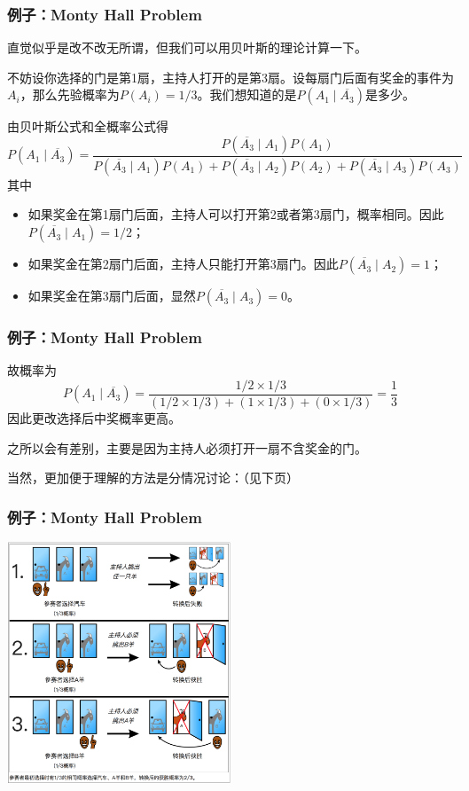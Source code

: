 \documentclass[9pt,dvipsnames]{beamer}
\begin{document}
\begin{frame}
	\frametitle{例子：Monty Hall Problem}
	直觉似乎是改不改无所谓，但我们可以用贝叶斯的理论计算一下。

	不妨设你选择的门是第1扇，主持人打开的是第3扇。设每扇门后面有奖金的事件为$A_i$，那么先验概率为$P(A_i)=1/3$。我们想知道的是$P(A_1\mid \overline{A_3})$是多少。\pause

	由贝叶斯公式和全概率公式得
	\[ P(A_1\mid \overline{A_3}) = \frac{P(\overline{A_3}\mid A_1)P(A_1)}{P(\overline{A_3}\mid A_1)P(A_1)+P(\overline{A_3}\mid A_2)P(A_2)+P(\overline{A_3}\mid A_3)P(A_3)} \]
	其中
	\begin{itemize}
		\item 如果奖金在第1扇门后面，主持人可以打开第2或者第3扇门，概率相同。因此$P(\overline{A_3}\mid A_1)=1/2$；
		\item 如果奖金在第2扇门后面，主持人只能打开第3扇门。因此$P(\overline{A_3}\mid A_2)=1$；
		\item 如果奖金在第3扇门后面，显然$P(\overline{A_3}\mid A_3)=0$。
	\end{itemize}
\end{frame}
\begin{frame}
	\frametitle{例子：Monty Hall Problem}
	故概率为
	\[ P(A_1\mid \overline{A_3}) = \frac{1/2\times 1/3}{(1/2\times 1/3)+(1\times 1/3)+(0\times 1/3)} = \frac{1}{3} \]
	因此更改选择后中奖概率更高。\pause
	\vspace{1em}

	之所以会有差别，主要是因为主持人必须打开一扇不含奖金的门。

	当然，更加便于理解的方法是分情况讨论：（见下页）
\end{frame}
\begin{frame}
	\frametitle{例子：Monty Hall Problem}
	\begin{center}
		\includegraphics[width=0.5\textwidth]{images/montyhall.png}
	\end{center}
\end{frame}
\end{document}
